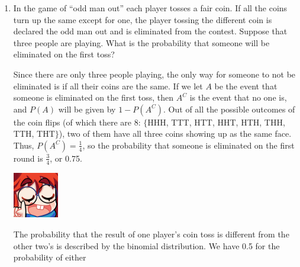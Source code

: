 \documentclass{article}
\begin{document}
\begin{enumerate}
\begin{enumerate}
\begin{figure}[h]
        \end{figure}
    \end{enumerate}
    \item In the game of ``odd man out'' each player tosses a fair coin. If all the coins turn up the same except for one, the player tossing the different coin is declared the
    odd man out and is eliminated from the contest. Suppose that three people are playing. What is the probability that someone will be eliminated on the first toss?\begin{solution}
        Since there are only three people playing, the only way for someone to not be eliminated is if all their coins are the same. If we let \(A\) be the event that someone is 
        eliminated on the first toss, then \(A^C\) is the event that no one is, and \(P(A)\) will be given by \(1 - P (A^C)\). Out of all the possible outcomes 
        of the coin flips (of which there are 8: \(\lbrace{}\)HHH, TTT, HTT, HHT, HTH, THH, TTH, THT\(\rbrace{}\)),
        two of them have all three coins showing up as the same face. Thus, \(P(A^C) = \frac{1}{4}\), so the probability that someone is eliminated
        on the first round is \(\frac{3}{4}\), or 0.75. 
    \end{solution}
    \begin{minipage}[t]{.14\textwidth}
        \vspace{0pt}
        \includegraphics[width=2cm]{nerd_maddy.png} 
    \end{minipage}%
    \begin{solution}
        The probability that the result of one player's coin toss is different from the other two's is described by the binomial distribution. We have 0.5 for the probability of either 

\end{solution}
\end{enumerate}
\end{document}
